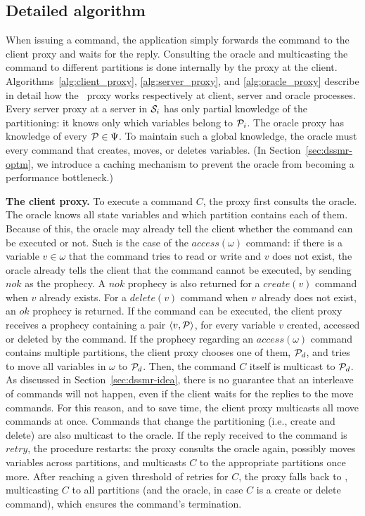 \subsection{Detailed algorithm}
\label{sec:dssmr-detail}


When issuing a command, the application simply forwards the command to the
client proxy and waits for the reply. Consulting the oracle and multicasting the
command to different partitions is done internally by the proxy at the client.
Algorithms~\ref{alg:client_proxy}, \ref{alg:server_proxy}, and
\ref{alg:oracle_proxy} describe in detail how the \dssmr\ proxy works
respectively at client, server and oracle processes. Every server proxy at a
server in $\mathcal{S}_i$ has only partial knowledge of the partitioning: it knows only
which variables belong to $\mathcal{P}_i$. The oracle proxy has knowledge of every
$\mathcal{P} \in \Psi$. To maintain such a global knowledge, the oracle must \amdel{}
every command that creates, moves, or deletes variables. (In
Section~\ref{sec:dssmr-optm}, we introduce a caching mechanism to prevent the oracle
from becoming a performance bottleneck.)



\textbf{The client proxy.} To execute a command $C$, the proxy first consults
the oracle. The oracle knows all state variables and which partition contains
each of them. Because of this, the oracle may already tell the client whether
the command can be executed or not. Such is the case of the $access(\omega)$
command: if there is a variable $v \in \omega$ that the command tries to read or
write and $v$ does not exist, the oracle already tells the client that the
command cannot be executed, by sending $nok$ as the prophecy. A $nok$ prophecy
is also returned for a $create(v)$ command when $v$ already exists. For a
$delete(v)$ command when $v$ already does not exist, an $ok$ prophecy is
returned. If the command can be executed, the client proxy receives a prophecy
containing a pair $\langle v, \mathcal{P} \rangle$, for every variable $v$ created,
accessed or deleted by the command. If the prophecy regarding an
$access(\omega)$ command contains multiple partitions, the client proxy chooses
one of them, $\mathcal{P}_d$, and tries to move all variables in $\omega$ to $\mathcal{P}_d$.
Then, the command $C$ itself is multicast to $\mathcal{P}_d$. As discussed in
Section~\ref{sec:dssmr-idea}, there is no guarantee that an interleave of
commands will not happen, even if the client waits for the replies to the move
commands. For this reason, and to save time, the client proxy multicasts all
move commands at once. Commands that change the partitioning (i.e., create and
delete) are also multicast to the oracle. If the reply received to the command
is $retry$, the procedure restarts: the proxy consults the oracle again,
possibly moves variables across partitions, and multicasts $C$ to the
appropriate partitions once more. After reaching a given threshold of retries
for $C$, the proxy falls back to \ssmr{}, multicasting $C$ to all partitions
(and the oracle, in case $C$ is a create or delete command), which ensures the
command's termination.

